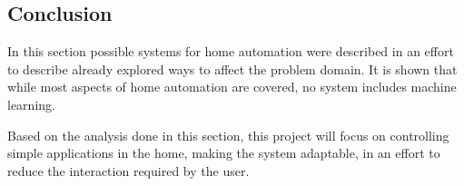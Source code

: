 \subsection{Conclusion}
In this section possible systems for home automation were described in an effort to describe already explored ways to affect the problem domain. It is shown that while most aspects of home automation are covered, no system includes machine learning.

Based on the analysis done in this section, this project will focus on controlling simple applications in the home, making the system adaptable, in an effort to reduce the interaction required by the user.
